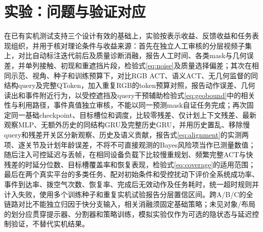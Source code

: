 \section{实验：问题与验证对应}
在已有实机测试支持三个设计有效的基础上，实验按表示收益、反馈收益和任务表现组织，并用于核对理论条件与收益来源：首先在独立人工审核的分层视频子集上，对比自动标注迭代前后及质量诊断消融，报告人工时间、各类mask与几何误差，并单列接触、初现和重遮挡片段，检验式\eqref{eq:noise}及质量选择偏差；其次在相同示范、视角、种子和训练预算下，对比RGB ACT、语义ACT、无几何监督的同结构query及完整QToken，加入重复RGB的token预算对照，报告动作误差、几何读出和事件附近行为，以受控遮挡及query干预辅助检验式\eqref{eq:geobound}中的相关性与利用路径，事件真值独立审核，不能以同一预测mask自证任务完成；再次固定同一基础checkpoint、目标槽位和调度，比较零残差、仅计划上下文残差、最新观察MLP、无额外历史的同结构GRU及完整历史GRU，并用历史置乱、移除慢query和残差开关区分新观察、历史及语义贡献，报告式\eqref{eq:alignment}的实测两项、逐关节及计划年龄误差，不将不可直接观测的Bayes风险项当作已测量数值；随后注入可控延迟与丢帧，在相同设备负载下比较慢重规划、频繁完整ACT与快残差的时延分位数、目标槽覆盖率和恢复表现，检验式\eqref{eq:coverage}的适用范围；最后在两个真实平台的多类任务、配对初始条件和受控扰动下评价全系统成功率、事件到达率、拨空气次数、恢复率、完成后无效动作及任务耗时，统一超时规则并计入失败，使用多个训练种子和重复实机试验报告分层置信区间。跨A/B/C的全链路对比不能独立归因于快分支输入，相关消融须固定基础策略；未见对象/布局的划分应贯穿提示器、分割器和策略训练，模拟实验仅作为可选的隐状态与延迟控制验证，不替代实机结果。
